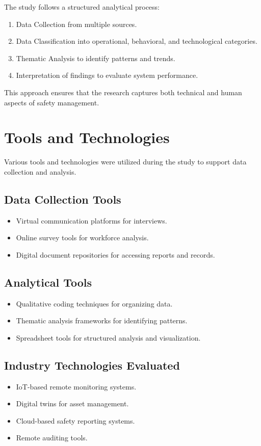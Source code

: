 \documentclass[conference]{IEEEtran}
\begin{document}
The study follows a structured analytical process:

\begin{enumerate}
\item Data Collection from multiple sources.
\item Data Classification into operational, behavioral, and technological categories.
\item Thematic Analysis to identify patterns and trends.
\item Interpretation of findings to evaluate system performance.
\end{enumerate}

This approach ensures that the research captures both technical and human aspects of safety management.

\section{Tools and Technologies}

Various tools and technologies were utilized during the study to support data collection and analysis.

\subsection{Data Collection Tools}
\begin{itemize}
\item Virtual communication platforms for interviews.
\item Online survey tools for workforce analysis.
\item Digital document repositories for accessing reports and records.
\end{itemize}

\subsection{Analytical Tools}
\begin{itemize}
\item Qualitative coding techniques for organizing data.
\item Thematic analysis frameworks for identifying patterns.
\item Spreadsheet tools for structured analysis and visualization.
\end{itemize}

\subsection{Industry Technologies Evaluated}
\begin{itemize}
\item IoT-based remote monitoring systems.
\item Digital twins for asset management.
\item Cloud-based safety reporting systems.
\item Remote auditing tools.
\end{itemize}
\end{document}
